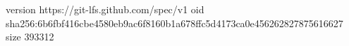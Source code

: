version https://git-lfs.github.com/spec/v1
oid sha256:6b6fbf416cbe4580eb9ac6f8160b1a678ffc5d4173ca0e456262827875616627
size 393312
